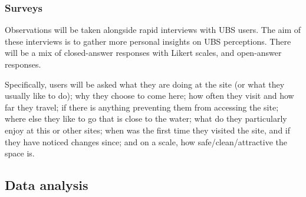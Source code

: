 \documentclass{article}
\begin{document}
\subsubsection{Surveys}

Observations will be taken alongside rapid interviews with UBS users. The aim of these interviews is to gather more personal insights on UBS perceptions. There will be a mix of closed-answer responses with Likert scales, and open-answer responses.

Specifically, users will be asked what they are doing at the site (or what they usually like to do); why they choose to come here; how often they visit and how far they travel; if there is anything preventing them from accessing the site; where else they like to go that is close to the water; what do they particularly enjoy at this or other sites; when was the first time they visited the site, and if they have noticed changes since; and on a scale, how safe/clean/attractive the space is.

\subsection{Data analysis}
\end{document}
